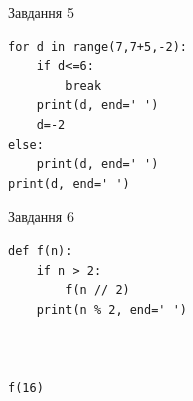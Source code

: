 \documentclass[12pt, ukrainian]{article}
\begin{document}
{\vspace{15mm}
\begin{minipage}[t]{9.7cm}                
{\begin{center}Завдання {5}\end{center}}
\begin{verbatim}
for d in range(7,7+5,-2):
    if d<=6:
        break
    print(d, end=' ')
    d=-2
else:
    print(d, end=' ')
print(d, end=' ')
\end{verbatim}     
\end{minipage}
\vline \hspace{8mm}
\begin{minipage}[t]{8.0cm}                
{\begin{center}Завдання {6}\end{center}}
\begin{verbatim}
def f(n):
    if n > 2:
        f(n // 2)
    print(n % 2, end=' ')
    


f(16)
\end{verbatim}     
\end{minipage}

}
\newpage
\end{document}
